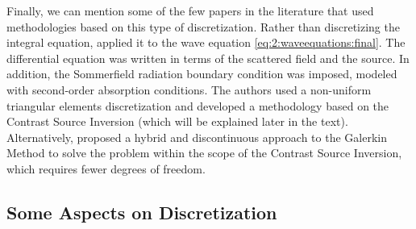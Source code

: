 			Finally, we can mention some of the few papers in the literature that used methodologies based on this type of discretization. Rather than discretizing the integral equation, \cite{zakaria2010finite} applied it to the wave equation \eqref{eq:2:waveequations:final}. The differential equation was written in terms of the scattered field and the source. In addition, the Sommerfield radiation boundary condition was imposed, modeled with second-order absorption conditions. The authors used a non-uniform triangular elements discretization and developed a methodology based on the Contrast Source Inversion (which will be explained later in the text). Alternatively, \cite{brown2019hybridizable} proposed a hybrid and discontinuous approach to the Galerkin Method to solve the problem within the scope of the Contrast Source Inversion, which requires fewer degrees of freedom.
		
		\subsection{Some Aspects on Discretization}\label{chap:methods:discretization:aspects}
		
